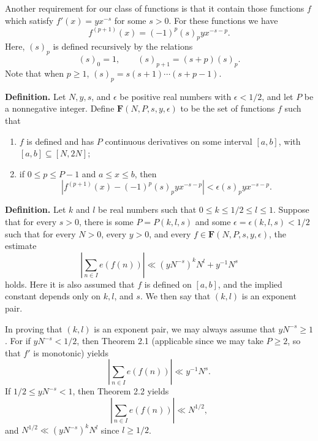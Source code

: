 \documentclass[10pt]{article}
\newcommand{\Fclass}{\mathbf{F}}
\begin{document}
Another requirement for our class of functions is that it contain those
functions $f$ which satisfy $f'(x)=yx^{-s}$ for some $s>0$. For these
functions we have
\[
 f^{(p+1)}(x)=(-1)^p(s)_p yx^{-s-p}.
\]
Here, $(s)_p$ is defined recursively by the relations
\[
 (s)_0=1,
 \qquad
 (s)_{p+1}=(s+p)(s)_p.
\]
Note that when $p\geq1$, $(s)_p=s(s+1)\cdots(s+p-1)$.

\medskip
\noindent\textbf{Definition.}
Let $N,y,s$, and $\epsilon$ be positive real numbers with $\epsilon<1/2$, and
let $P$ be a nonnegative integer. Define $\Fclass(N,P,s,y,\epsilon)$ to be the
set of functions $f$ such that
\begin{enumerate}
 \item $f$ is defined and has $P$ continuous derivatives on some interval
       $[a,b]$, with $[a,b]\subseteq[N,2N]$;
 \item if $0\leq p\leq P-1$ and $a\leq x\leq b$, then
 \begin{equation*}
  \left|f^{(p+1)}(x)-(-1)^p(s)_p yx^{-s-p}\right|
  <\epsilon(s)_p yx^{-s-p}. \tag{3.3.3}
 \end{equation*}
\end{enumerate}

\medskip
\noindent\textbf{Definition.}
Let $k$ and $l$ be real numbers such that
$0\leq k\leq1/2\leq l\leq1$. Suppose that for every $s>0$, there is some
$P=P(k,l,s)$ and some $\epsilon=\epsilon(k,l,s)<1/2$ such that for every
$N>0$, every $y>0$, and every
$f\in\Fclass(N,P,s,y,\epsilon)$, the estimate
\begin{equation*}
 \left|\sum_{n\in I}e(f(n))\right|
 \ll (yN^{-s})^kN^l+y^{-1}N^s \tag{3.3.4}
\end{equation*}
holds. Here it is also assumed that $f$ is defined on $[a,b]$, and the implied
constant depends only on $k,l$, and $s$. We then say that $(k,l)$ is an
exponent pair.

In proving that $(k,l)$ is an exponent pair, we may always assume that
$yN^{-s}\geq1$. For if $yN^{-s}<1/2$, then Theorem 2.1 (applicable since
we may take $P\geq2$, so that $f'$ is monotonic) yields
\[
 \left|\sum_{n\in I}e(f(n))\right|\ll y^{-1}N^s.
\]
If $1/2\leq yN^{-s}<1$, then Theorem 2.2 yields
\[
 \left|\sum_{n\in I}e(f(n))\right|\ll N^{1/2},
\]
and $N^{1/2}\ll(yN^{-s})^kN^l$ since $l\geq1/2$.
\end{document}
